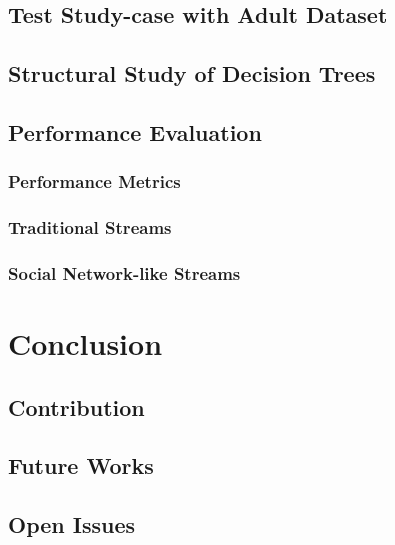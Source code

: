 \documentclass[a4paper, 11pt, oneside]{book}
\begin{document}
\section{Test Study-case with Adult Dataset}
\section{Structural Study of Decision Trees}
\section{Performance Evaluation}
\subsection{Performance Metrics}
\subsection{Traditional Streams}
\subsection{Social Network-like Streams}

\chapter{Conclusion}
\section{Contribution}
\section{Future Works}
\section{Open Issues}



\end{document}
